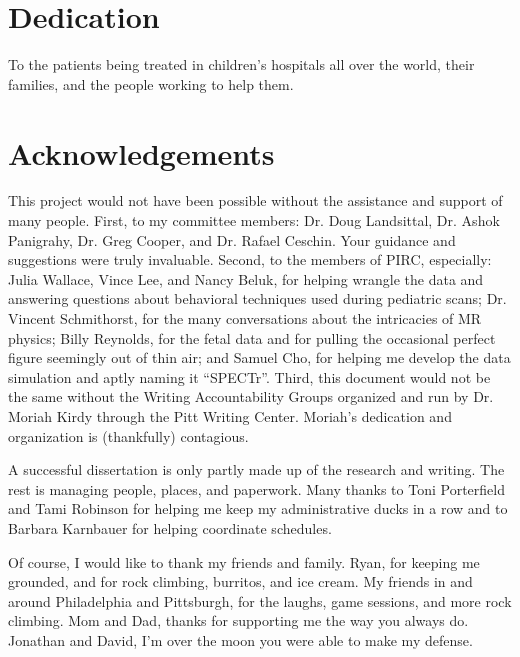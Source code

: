 \documentclass[hidelinks,final]{pittetd}
\begin{document}
\tableofcontents
\listoftables                     
\listoffigures                     

\preface

\section{Dedication}
To the patients being treated in children's hospitals all over the world, their families, and the people working to help them.         

\clearpage

\section{Acknowledgements}

This project would not have been possible without the assistance and support of many people. First, to my committee members: Dr. Doug Landsittal, Dr. Ashok Panigrahy, Dr. Greg Cooper, and Dr. Rafael Ceschin. Your guidance and suggestions were truly invaluable. Second, to the members of PIRC, especially: Julia Wallace, Vince Lee, and Nancy Beluk, for helping wrangle the data and answering questions about behavioral techniques used during pediatric scans; Dr. Vincent Schmithorst, for the many conversations about the intricacies of MR physics; Billy Reynolds, for the fetal data and for pulling the occasional perfect figure seemingly out of thin air; and Samuel Cho, for helping me develop the data simulation and aptly naming it ``SPECTr''. Third, this document would not be the same without the Writing Accountability Groups organized and run by Dr. Moriah Kirdy through the Pitt Writing Center. Moriah's dedication and organization is (thankfully) contagious. 

A successful dissertation is only partly made up of the research and writing. The rest is managing people, places, and paperwork. Many thanks to Toni Porterfield and Tami Robinson for helping me keep my administrative ducks in a row and to Barbara Karnbauer for helping coordinate schedules. 

Of course, I would like to thank my friends and family. Ryan, for keeping me grounded, and for rock climbing, burritos, and ice cream. My friends in and around Philadelphia and Pittsburgh, for the laughs, game sessions, and more rock climbing. Mom and Dad, thanks for supporting me the way you always do. Jonathan and David, I'm over the moon you were able to make my defense. 
\end{document}
